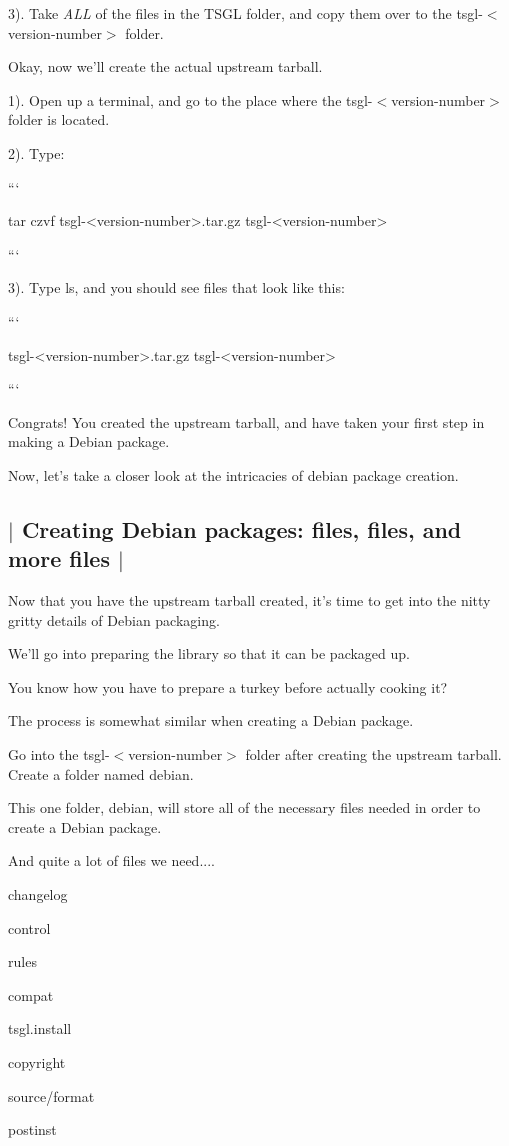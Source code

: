 3). Take {\itshape A\-L\-L} of the files in the T\-S\-G\-L folder, and copy them over to the {\ttfamily tsgl-\/$<$version-\/number$>$} folder.

Okay, now we'll create the actual upstream tarball.

1). Open up a terminal, and go to the place where the {\ttfamily tsgl-\/$<$version-\/number$>$} folder is located.

2). Type\-:

``` \begin{DoxyVerb}tar czvf tsgl-<version-number>.tar.gz tsgl-<version-number>
\end{DoxyVerb}


```

3). Type {\ttfamily ls}, and you should see files that look like this\-:

``` \begin{DoxyVerb}tsgl-<version-number>.tar.gz tsgl-<version-number> 
\end{DoxyVerb}


```

Congrats! You created the upstream tarball, and have taken your first step in making a Debian package.

Now, let's take a closer look at the intricacies of debian package creation. 

 \subsection*{$\vert$ Creating Debian packages\-: files, files, and more files $\vert$ }

Now that you have the upstream tarball created, it's time to get into the nitty gritty details of Debian packaging.

We'll go into preparing the library so that it can be packaged up.

You know how you have to prepare a turkey before actually cooking it?

The process is somewhat similar when creating a Debian package.

Go into the {\ttfamily tsgl-\/$<$version-\/number$>$} folder after creating the upstream tarball. Create a folder named {\ttfamily debian}.

This one folder, {\ttfamily debian}, will store all of the necessary files needed in order to create a Debian package.

And quite a lot of files we need....


\begin{DoxyItemize}
\item {\ttfamily changelog}
\item {\ttfamily control}
\item {\ttfamily rules}
\item {\ttfamily compat}
\item {\ttfamily tsgl.\-install}
\item {\ttfamily copyright}
\item {\ttfamily source/format}
\item {\ttfamily postinst}
\end{DoxyItemize}

